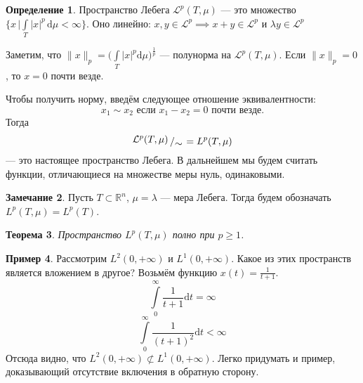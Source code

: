 \documentclass[11pt,openany,a4paper]{scrartcl}
\theoremstyle{plain}
\newtheorem{theorem}{Теорема}[section]
\theoremstyle{definition}
\newtheorem{definition}[theorem]{Определение}
\newtheorem{remark}[theorem]{Замечание}
\newtheorem{example}[theorem]{Пример}
\newcommand\mb{\mathbb}
\newcommand\real{\mb R}
\newcommand{\dif}{\, \mathrm d}
\newcommand{\bigslant}[2]{{\raisebox{.2em}{$#1$}\left/\raisebox{-.2em}{$#2$}\right.}}
\begin{document}
\begin{definition}
    Пространство Лебега $\mathcal{L}^p(T, \mu)$ — это множество
    $\{x\, \big| \int\limits_T |x|^p\dif\mu <
    \infty\}$.
    Оно линейно: $x, y \in \mathcal{L}^p \implies
    x + y \in \mathcal{L}^p$ и $\lambda y \in \mathcal{L}^p$
\end{definition}

Заметим, что $\|x\|_p = \bigg(\int\limits_T |x|^p\mathrm d\mu\bigg)^\frac{1}{p}$ — полунорма
на $\mathcal{L}^p(T, \mu)$. Если $\|x\|_p = 0$, то $x = 0$ почти везде.

Чтобы получить норму, введём следующее отношение эквивалентности:
$$
x_1 \sim x_2 \text{ если } x_1 - x_2 = 0 \text{ почти везде.}
$$
Тогда
$$
\bigslant{\mathcal{L}^p(T, \mu)}{\sim} = L^p(T, \mu)
$$
— это настоящее пространство Лебега. В дальнейшем мы будем считать функции, 
отличающиеся на множестве меры нуль, одинаковыми.

\begin{remark}
    Пусть $T \subset \real^n$, $\mu = \lambda$ — мера Лебега. Тогда будем 
    обозначать $L^p(T, \mu) = L^p(T)$.
\end{remark}

\begin{theorem}
    Пространство $L^p(T, \mu)$ полно при $p \geqslant 1$.
\end{theorem}

\begin{example}
    Рассмотрим $L^2(0, +\infty)$ и $L^1(0, +\infty)$. Какое из этих пространств 
    является вложением в другое? Возьмём функцию $x(t) = \frac{1}{t + 1}$.
    $$
    \int\limits_0^\infty \frac{1}{t + 1}\mathrm dt = \infty
    $$
    $$
    \int\limits_0^\infty \frac{1}{(t+1)^2} \mathrm dt < \infty
    $$
    Отсюда видно, что $L^2(0, +\infty) \not\subset L^1(0, +\infty)$. Легко 
    придумать и пример, доказывающий отсутствие включения в обратную сторону.
\end{example}
\end{document}
